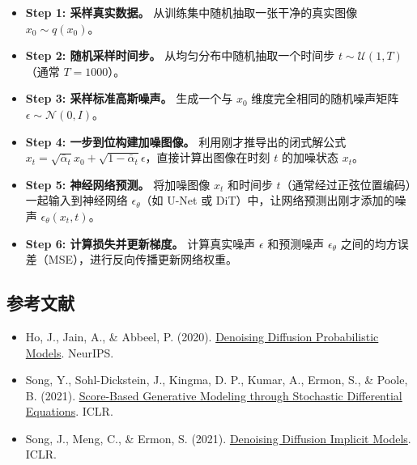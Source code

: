 \begin{itemize}
\tightlist
\item
  \textbf{Step 1: 采样真实数据。} 从训练集中随机抽取一张干净的真实图像 \(x_0\sim q(x_0)\)。
\item
  \textbf{Step 2: 随机采样时间步。} 从均匀分布中随机抽取一个时间步 \(t\sim\mathcal{U}(1,T)\)（通常 \(T=1000\)）。
\item
  \textbf{Step 3: 采样标准高斯噪声。} 生成一个与 \(x_0\) 维度完全相同的随机噪声矩阵 \(\epsilon\sim\mathcal{N}(0,I)\)。
\item
  \textbf{Step 4: 一步到位构建加噪图像。} 利用刚才推导出的闭式解公式 \(x_t=\sqrt{\bar{\alpha}_t}x_0+\sqrt{1-\bar{\alpha}_t}\epsilon\)，直接计算出图像在时刻 \(t\) 的加噪状态 \(x_t\)。
\item
  \textbf{Step 5: 神经网络预测。} 将加噪图像 \(x_t\) 和时间步 \(t\)（通常经过正弦位置编码）一起输入到神经网络 \(\epsilon_\theta\)（如 U-Net 或 DiT）中，让网络预测出刚才添加的噪声 \(\epsilon_\theta(x_t,t)\)。
\item
  \textbf{Step 6: 计算损失并更新梯度。} 计算真实噪声 \(\epsilon\) 和预测噪声 \(\epsilon_\theta\) 之间的均方误差（MSE），进行反向传播更新网络权重。
\end{itemize}

\FloatBarrier
{}
\hypertarget{ux53c2ux8003ux6587ux732e-128}{%
\subsection{参考文献}\label{ux53c2ux8003ux6587ux732e-128}}

\vspace{0.25em}
\begin{itemize}
\tightlist
\item
  Ho, J., Jain, A., \& Abbeel, P. (2020). \href{https://arxiv.org/abs/2006.11239}{Denoising Diffusion Probabilistic Models}. NeurIPS.
\item
  Song, Y., Sohl-Dickstein, J., Kingma, D. P., Kumar, A., Ermon, S., \& Poole, B. (2021). \href{https://arxiv.org/abs/2011.13456}{Score-Based Generative Modeling through Stochastic Differential Equations}. ICLR.
\item
  Song, J., Meng, C., \& Ermon, S. (2021). \href{https://arxiv.org/abs/2010.02502}{Denoising Diffusion Implicit Models}. ICLR.
\end{itemize}

\clearpage

